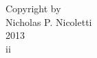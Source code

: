 


\begin{center}
\null
\vfill
\begin{doublespace}
Copyright by \\ 
Nicholas P. Nicoletti \\ 
2013 \\
ii
\end{doublespace}
\end{center}
